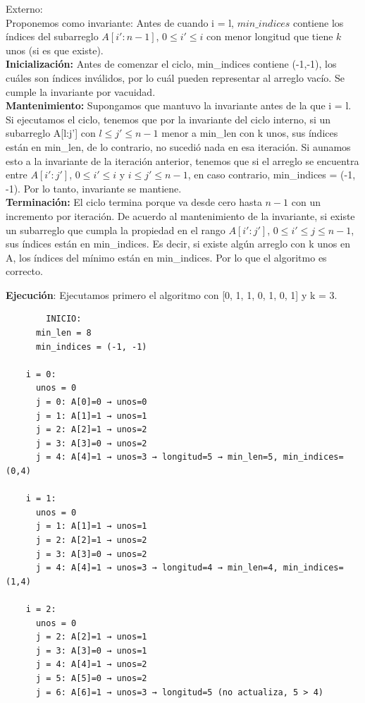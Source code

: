 \documentclass[12pt]{article}
\begin{document}
\begin{itemize}
    Externo:\\
    Proponemos como invariante: Antes de cuando i = l, $min\_indices$ contiene los índices del subarreglo $A[i':n - 1]$, $0 \leq i' \leq i$ con menor longitud que tiene $k$ unos (si es que existe).\\
    \textbf{Inicialización:} Antes de comenzar el ciclo, min\_indices contiene (-1,-1), los cuáles son índices inválidos, por lo cuál pueden representar al arreglo vacío. Se cumple la invariante por vacuidad.\\
    \textbf{Mantenimiento:} Supongamos que mantuvo la invariante antes de la que i = l. Si ejecutamos el ciclo, tenemos que por la invariante del ciclo interno, si un subarreglo A[l:j'] con $l \leq j' \leq n - 1$ menor a min\_len con k unos, sus índices están en min\_len, de lo contrario, no sucedió nada en esa iteración.
    Si aunamos esto a la invariante de la iteración anterior, tenemos que si el arreglo se encuentra entre $A[i':j']$, $0 \leq i' \leq i$ y $i \leq j' \leq n - 1$, en caso contrario, min\_indices = (-1, -1). Por lo tanto, invariante se mantiene.\\
    \textbf{Terminación:} El ciclo termina porque va desde cero hasta $n-1$ con un incremento por iteración.
    De acuerdo al mantenimiento de la invariante, si existe un subarreglo que cumpla la propiedad en el rango $A[i':j']$, $0 \leq i' \leq j \leq n - 1$, sus índices están en min\_indices. Es decir, si existe algún arreglo con k unos en A, los índices del mínimo están en min\_indices. Por lo que el algoritmo es correcto.

    \textbf{Ejecución}: Ejecutamos primero el algoritmo con [0, 1, 1, 0, 1, 0, 1] y k = 3.
    \begin{verbatim}
        INICIO:
      min_len = 8
      min_indices = (-1, -1)

    i = 0:
      unos = 0
      j = 0: A[0]=0 → unos=0
      j = 1: A[1]=1 → unos=1
      j = 2: A[2]=1 → unos=2
      j = 3: A[3]=0 → unos=2
      j = 4: A[4]=1 → unos=3 → longitud=5 → min_len=5, min_indices=(0,4)

    i = 1:
      unos = 0
      j = 1: A[1]=1 → unos=1
      j = 2: A[2]=1 → unos=2
      j = 3: A[3]=0 → unos=2
      j = 4: A[4]=1 → unos=3 → longitud=4 → min_len=4, min_indices=(1,4)

    i = 2:
      unos = 0
      j = 2: A[2]=1 → unos=1
      j = 3: A[3]=0 → unos=1
      j = 4: A[4]=1 → unos=2
      j = 5: A[5]=0 → unos=2
      j = 6: A[6]=1 → unos=3 → longitud=5 (no actualiza, 5 > 4)


\end{verbatim}
\end{itemize}
\end{document}

